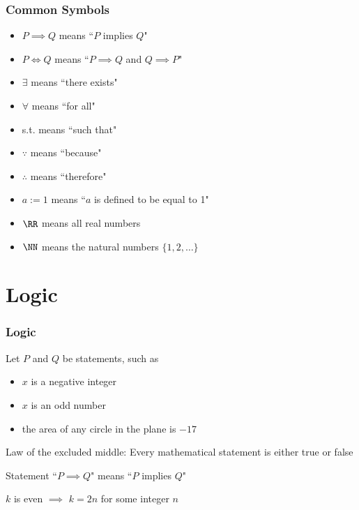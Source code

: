 \begin{frame}
    \frametitle{Common Symbols}

    \begin{itemize}
        \item $P \implies Q$ means ``$P$ implies $Q$"
        \item $P \iff Q$ means ``$P \implies Q$ and $Q \implies P$"
        \item $\exists$ means ``there exists"
        \item $\forall$ means ``for all"
        \item s.t. means ``such that"
        \item $\because$ means ``because"
        \item $\therefore$ means ``therefore"
        \item $a := 1$ means ``$a$ is defined to be equal to 1"
        \item $\RR$ means all real numbers
        \item $\NN$ means the natural numbers $\{1, 2, \ldots \}$
    \end{itemize}

\end{frame}




\section{Logic}

\begin{frame}
    \frametitle{Logic}

    Let $P$ and $Q$ be statements, such as 
    \begin{itemize}
        \item $x$ is a negative integer
        \item $x$ is an odd number
        \item the area of any circle in the plane is $-17$
    \end{itemize}

    \vspace{1em}

    Law of the excluded middle: Every mathematical statement is either true or false

    \vspace{1em}

    Statement ``$P \implies Q$" means ``$P$ implies $Q$"

    \Eg $k$ is even $\implies$ $k = 2n$ for some integer $n$


\end{frame}



